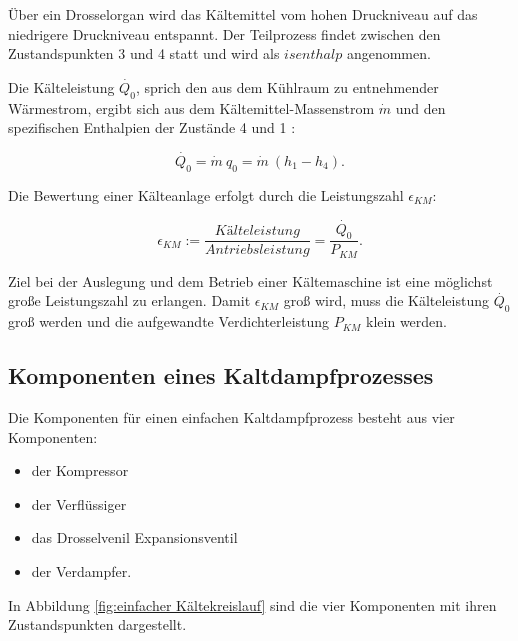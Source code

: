 Über ein Drosselorgan wird das Kältemittel vom hohen Druckniveau auf das niedrigere Druckniveau entspannt. Der Teilprozess findet zwischen den Zustandspunkten 3 und 4 statt und wird als $isenthalp$ angenommen.  
 
Die Kälteleistung $\dot{Q_0}$, sprich den aus dem Kühlraum zu entnehmender Wärmestrom, ergibt sich aus dem Kältemittel-Massenstrom $\dot{m}$ und den spezifischen Enthalpien der Zustände 4 und 1 :

\begin{equation}
	\dot{Q_0} = \dot{m}~ q_0 = \dot{m}~ (h_1 - h_4).
	\label{eq:Kälteleistung}
\end{equation}




Die Bewertung einer Kälteanlage erfolgt durch die Leistungszahl $\epsilon_{KM}$: 

\begin{equation}
	\epsilon_{KM} := \frac{Kälteleistung}{Antriebsleistung} =\frac{\dot{Q_0}}{P_{KM}}.
	\label{eq:Leistungszahl}
\end{equation}

Ziel bei der Auslegung und dem Betrieb einer Kältemaschine ist eine möglichst große Leistungszahl zu erlangen. Damit $\epsilon_{KM}$ groß wird, muss die Kälteleistung $\dot{Q_0}$ groß werden und die aufgewandte Verdichterleistung $P_{KM}$ klein werden. 

\subsection{Komponenten eines Kaltdampfprozesses}
\label{subsec:Komponenten eines Kaltdampfprozesses}

Die Komponenten für einen einfachen Kaltdampfprozess  besteht aus vier Komponenten:

\begin{itemize}
\item der Kompressor
\item der Verflüssiger 
\item das Drosselvenil Expansionsventil
\item der Verdampfer. 
\end{itemize}

In Abbildung \ref{fig:einfacher Kältekreislauf} sind die vier Komponenten mit ihren Zustandspunkten dargestellt.

